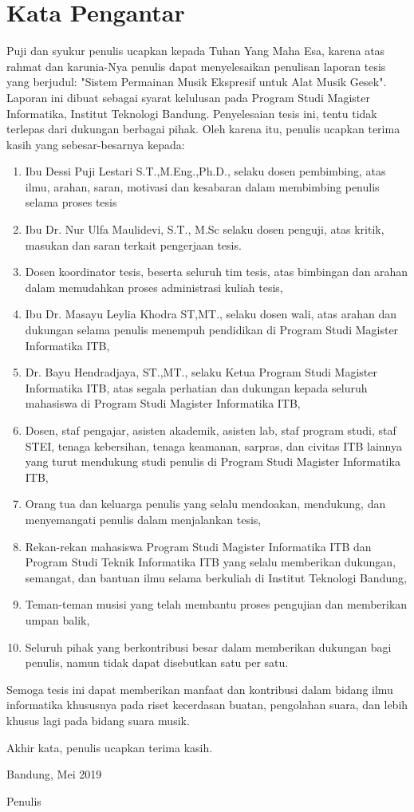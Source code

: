 \chapter*{Kata Pengantar}

Puji dan syukur penulis ucapkan kepada Tuhan Yang Maha Esa, karena atas rahmat dan karunia-Nya penulis dapat menyelesaikan penulisan laporan tesis yang berjudul: "Sistem Permainan Musik Ekspresif untuk Alat Musik Gesek". Laporan ini dibuat sebagai syarat kelulusan pada Program Studi Magister Informatika, Institut Teknologi Bandung. Penyelesaian tesis ini, tentu tidak terlepas dari dukungan berbagai pihak. Oleh karena itu, penulis ucapkan terima kasih yang sebesar-besarnya kepada:

\begin{enumerate}
\item Ibu Dessi Puji Lestari S.T.,M.Eng.,Ph.D., selaku dosen pembimbing, atas ilmu, arahan, saran, motivasi dan kesabaran dalam membimbing penulis selama proses tesis
\item Ibu Dr. Nur Ulfa Maulidevi, S.T., M.Sc selaku dosen penguji, atas kritik, masukan dan saran terkait pengerjaan tesis. %
% 
\item %
Dosen koordinator tesis, beserta seluruh tim tesis, atas bimbingan dan arahan dalam memudahkan proses administrasi kuliah tesis,
\item Ibu Dr. Masayu Leylia Khodra ST,MT., selaku dosen wali, atas arahan dan dukungan selama penulis menempuh pendidikan di Program Studi Magister Informatika ITB,
\item Dr. Bayu Hendradjaya, ST.,MT., selaku Ketua Program Studi Magister Informatika ITB, atas segala perhatian dan dukungan kepada seluruh mahasiswa di Program Studi Magister Informatika ITB,
\item Dosen, staf pengajar, asisten akademik, asisten lab, staf program studi, staf STEI, tenaga kebersihan, tenaga keamanan, sarpras, dan civitas ITB lainnya yang turut mendukung studi penulis di Program Studi Magister Informatika ITB,
\item Orang tua dan keluarga penulis yang selalu mendoakan, mendukung, dan menyemangati penulis dalam menjalankan tesis,
\item Rekan-rekan mahasiswa Program Studi Magister Informatika ITB dan Program Studi Teknik Informatika ITB yang selalu memberikan dukungan, semangat, dan bantuan ilmu selama berkuliah di Institut Teknologi Bandung,
\item Teman-teman musisi yang telah membantu proses pengujian dan memberikan umpan balik,
\item Seluruh pihak yang berkontribusi besar dalam memberikan dukungan bagi penulis, namun tidak dapat disebutkan satu per satu.
\end{enumerate}

Semoga tesis ini dapat memberikan manfaat dan kontribusi dalam bidang ilmu informatika khususnya pada riset kecerdasan buatan, pengolahan suara, dan lebih khusus lagi pada bidang suara musik.

Akhir kata, penulis ucapkan terima kasih.

\vspace{15mm}

Bandung, Mei 2019

Penulis